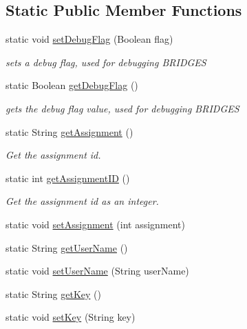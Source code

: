 \subsection*{Static Public Member Functions}
\begin{DoxyCompactItemize}
\item 
static void \hyperlink{classbridges_1_1connect_1_1_bridges_a9295b15aa880aa976706ed4f3337fb3b}{set\+Debug\+Flag} (Boolean flag)
\begin{DoxyCompactList}\small\item\em sets a debug flag, used for debugging B\+R\+I\+D\+G\+ES \end{DoxyCompactList}\item 
static Boolean \hyperlink{classbridges_1_1connect_1_1_bridges_a5c9fa0dd62084bfd916c8bdecee3f517}{get\+Debug\+Flag} ()
\begin{DoxyCompactList}\small\item\em gets the debug flag value, used for debugging B\+R\+I\+D\+G\+ES \end{DoxyCompactList}\item 
static String \hyperlink{classbridges_1_1connect_1_1_bridges_af049c06c532987eb616156fb16ea2f43}{get\+Assignment} ()
\begin{DoxyCompactList}\small\item\em Get the assignment id. \end{DoxyCompactList}\item 
static int \hyperlink{classbridges_1_1connect_1_1_bridges_ac13ed456687540b57c138adb11735d95}{get\+Assignment\+ID} ()
\begin{DoxyCompactList}\small\item\em Get the assignment id as an integer. \end{DoxyCompactList}\item 
static void \hyperlink{classbridges_1_1connect_1_1_bridges_ad56c9d138965c41947bb51fe056c1cc9}{set\+Assignment} (int assignment)
\item 
static String \hyperlink{classbridges_1_1connect_1_1_bridges_a75f047cda3100e0cfa88378293c12961}{get\+User\+Name} ()
\item 
static void \hyperlink{classbridges_1_1connect_1_1_bridges_af9b9a2ca03ba02c0c2be4716594678a6}{set\+User\+Name} (String user\+Name)
\item 
static String \hyperlink{classbridges_1_1connect_1_1_bridges_a426897d6e5449601bb4e20c32b8346f5}{get\+Key} ()
\item 
static void \hyperlink{classbridges_1_1connect_1_1_bridges_ab69e89ec7d2e674a8b8c4b0be0c63397}{set\+Key} (String key)
\end{DoxyCompactItemize}


